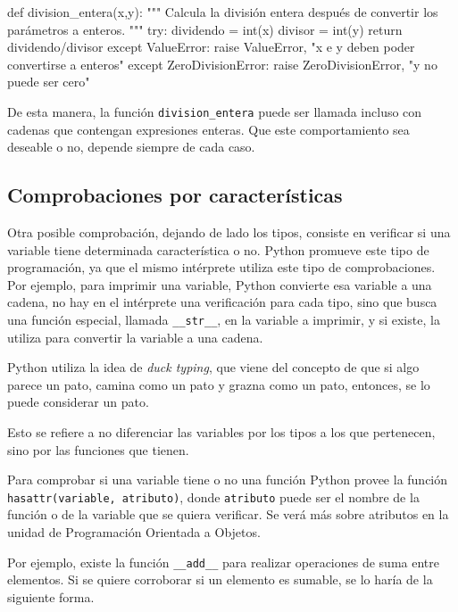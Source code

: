 \begin{codigo-python-sn}
def division_entera(x,y):
    """ Calcula la división entera después de convertir los parámetros a
    enteros. """
    try:
        dividendo = int(x)
        divisor = int(y)
        return dividendo/divisor
    except ValueError:
        raise ValueError, "x e y deben poder convertirse a enteros"
    except ZeroDivisionError:
        raise ZeroDivisionError, "y no puede ser cero"
\end{codigo-python-sn}

De esta manera, la función \lstinline!division_entera! puede ser llamada
incluso con cadenas que contengan expresiones enteras. Que este
comportamiento sea deseable o no, depende siempre de cada caso.

\subsection{Comprobaciones por características}

Otra posible comprobación, dejando de lado los tipos, consiste en verificar
si una variable tiene determinada característica o no. Python promueve este
tipo de programación, ya que el mismo intérprete utiliza este tipo de
comprobaciones. Por ejemplo, para imprimir una variable, Python convierte
esa variable a una cadena, no hay en el intérprete una verificación para
cada tipo, sino que busca una función especial, llamada
\lstinline!__str__!, en la variable a imprimir, y si existe, la utiliza
para convertir la variable a una cadena.

\begin{sabias_que}
Python utiliza la idea de {\it duck typing}, que viene del concepto de que
si algo parece un pato, camina como un pato y grazna como un pato,
entonces, se lo puede considerar un pato.

Esto se refiere a no diferenciar las variables por los tipos a los que
pertenecen, sino por las funciones que tienen.
\end{sabias_que}

Para comprobar si una variable tiene o no una función Python provee la
función \lstinline!hasattr(variable, atributo)!, donde \lstinline!atributo!
puede ser el nombre de la función o de la variable que se quiera verificar.
Se verá más sobre atributos en la unidad de Programación Orientada a
Objetos.

Por ejemplo, existe la función \lstinline!__add__! para realizar
operaciones de suma entre elementos.  Si se quiere corroborar si un
elemento es sumable, se lo haría de la siguiente forma.

